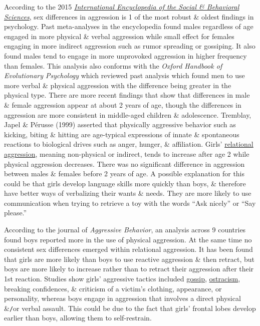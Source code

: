 \documentclass[oneside]{book}
\numberwithin{equation}{section}
\begin{document}
According to the 2015 \href{https://en.wikipedia.org/wiki/International_Encyclopedia_of_the_Social_%26_Behavioral_Sciences}{\textit{International Encyclopedia of the Social \& Behavioral Sciences}}, sex differences in aggression is 1 of the most robust \& oldest findings in psychology. Past meta-analyses in the encyclopedia found males regardless of age engaged in more physical \& verbal aggression while small effect for females engaging in more indirect aggression such as rumor spreading or gossiping. It also found males tend to engage in more unprovoked aggression in higher frequency than females. This analysis also conforms with the \textit{Oxford Handbook of Evolutionary Psychology} which reviewed past analysis which found men to use more verbal \& physical aggression with the difference being greater in the physical type. There are more recent findings that show that differences in male \& female aggression appear at about 2 years of age, though the differences in aggression are more consistent in middle-aged children \& adolescence. Tremblay, Japel \& P\'erusse (1999) asserted that physically aggressive behavior such as kicking, biting \& hitting are age-typical expressions of innate \& spontaneous reactions to biological drives such as anger, hunger, \& affiliation. Girls' \href{https://en.wikipedia.org/wiki/Relational_aggression}{relational aggression}, meaning non-physical or indirect, tends to increase after age 2 while physical aggression decreases. There was no significant difference in aggression between males \& females before 2 years of age. A possible explanation for this could be that girls develop language skills more quickly than boys, \& therefore have better ways of verbalizing their wants \& needs. They are more likely to use communication when trying to retrieve a toy with the words ``Ask nicely'' or ``Say please.''

According to the journal of \textit{Aggressive Behavior}, an analysis across 9 countries found boys reported more in the use of physical aggression. At the same time no consistent sex differences emerged within relational aggression. It has been found that girls are more likely than boys to use reactive aggression \& then retract, but boys are more likely to increase rather than to retract their aggression after their 1st reaction. Studies show girls' aggressive tactics included \href{https://en.wikipedia.org/wiki/Gossip}{gossip}, \href{https://en.wikipedia.org/wiki/Social_rejection}{ostracism}, breaking confidences, \& criticism of a victim's clothing, appearance, or personality, whereas boys engage in aggression that involves a direct physical \&\texttt{/}or verbal assault. This could be due to the fact that girls' frontal lobes develop earlier than boys, allowing them to self-restrain.
\end{document}
